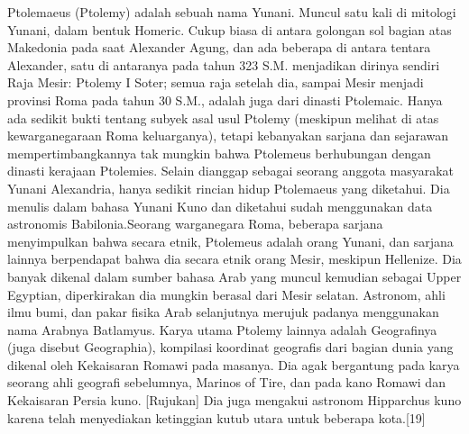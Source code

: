     Ptolemaeus (Ptolemy) adalah sebuah nama Yunani. Muncul satu kali di mitologi Yunani, dalam bentuk Homeric. Cukup biasa di antara golongan sol bagian atas Makedonia pada saat Alexander Agung, dan ada beberapa di antara tentara Alexander, satu di antaranya pada tahun 323 S.M. menjadikan dirinya sendiri Raja Mesir: Ptolemy I Soter; semua raja setelah dia, sampai Mesir menjadi provinsi Roma pada tahun 30 S.M., adalah juga dari dinasti Ptolemaic. Hanya ada sedikit bukti tentang subyek asal usul Ptolemy (meskipun melihat di atas kewarganegaraan Roma keluarganya), tetapi kebanyakan sarjana dan sejarawan mempertimbangkannya tak mungkin bahwa Ptolemeus berhubungan dengan dinasti kerajaan Ptolemies.
    Selain dianggap sebagai seorang anggota masyarakat Yunani Alexandria, hanya sedikit rincian hidup Ptolemaeus yang diketahui. Dia menulis dalam bahasa Yunani Kuno dan diketahui sudah menggunakan data astronomis Babilonia.Seorang warganegara Roma, beberapa sarjana menyimpulkan bahwa secara etnik, Ptolemeus adalah orang Yunani, dan sarjana lainnya berpendapat bahwa dia secara etnik orang Mesir, meskipun Hellenize. Dia banyak dikenal dalam sumber bahasa Arab yang muncul kemudian sebagai Upper Egyptian, diperkirakan dia mungkin berasal dari Mesir selatan. Astronom, ahli ilmu bumi, dan pakar fisika Arab selanjutnya merujuk padanya menggunakan nama Arabnya Batlamyus.
    Karya utama Ptolemy lainnya adalah Geografinya (juga disebut Geographia), kompilasi koordinat geografis dari bagian dunia yang dikenal oleh Kekaisaran Romawi pada masanya. Dia agak bergantung pada karya seorang ahli geografi sebelumnya, Marinos of Tire, dan pada kano Romawi dan Kekaisaran Persia kuno. [Rujukan] Dia juga mengakui astronom Hipparchus kuno karena telah menyediakan ketinggian kutub utara untuk beberapa kota.[19]
  
